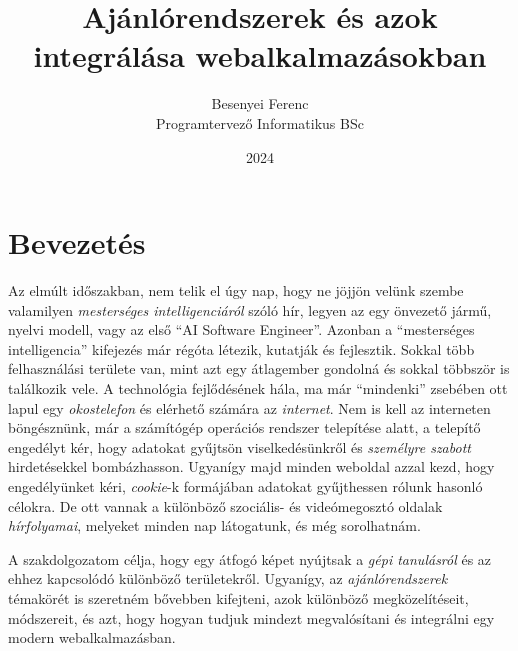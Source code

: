 \documentclass[
]{thesis-ekf}
\theoremstyle{definition}
\theoremstyle{remark}
\begin{document}
\title{Ajánlórendszerek és azok integrálása webalkalmazásokban}
\author{Besenyei Ferenc\\Programtervező Informatikus BSc}
\date{2024}
\maketitle
\tableofcontents

\chapter*{Bevezetés}
Az elmúlt időszakban, nem telik el úgy nap, hogy ne jöjjön velünk szembe valamilyen \emph{mesterséges intelligenciáról} szóló hír, legyen az egy önvezető jármű, nyelvi modell, vagy az első ``AI Software Engineer''. Azonban a ``mesterséges intelligencia'' kifejezés már régóta létezik, kutatják és fejlesztik. Sokkal több felhasználási területe van, mint azt egy átlagember gondolná és sokkal többször is találkozik vele. A technológia fejlődésének hála, ma már ``mindenki'' zsebében ott lapul egy \emph{okostelefon} és elérhető számára az \emph{internet}. Nem is kell az interneten böngésznünk, már a számítógép operációs rendszer telepítése alatt, a telepítő engedélyt kér, hogy adatokat gyűjtsön viselkedésünkről és \emph{személyre szabott} hirdetésekkel bombázhasson. Ugyanígy majd minden weboldal azzal kezd, hogy engedélyünket kéri, \emph{cookie}-k formájában adatokat gyűjthessen rólunk hasonló célokra. De ott vannak a különböző szociális- és videómegosztó oldalak \emph{hírfolyamai}, melyeket minden nap látogatunk, és még sorolhatnám.

A szakdolgozatom célja, hogy egy átfogó képet nyújtsak a \emph{gépi tanulásról} és az ehhez kapcsolódó különböző területekről. Ugyanígy, az \emph{ajánlórendszerek} témakörét is szeretném bővebben kifejteni, azok különböző megközelítéseit, módszereit, és azt, hogy hogyan tudjuk mindezt megvalósítani és integrálni egy modern webalkalmazásban.
\end{document}
